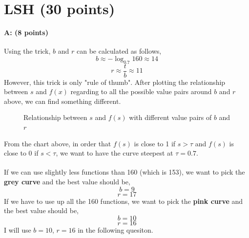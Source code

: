 \documentclass[11pt]{article}
\begin{document}
\section{LSH (30 points)}

\paragraph{A: (8 points)}
Using the trick, $b$ and $r$ can be calculated as follows,
$$b\approx-\log_{0.7}160\approx14$$
$$r\approx\frac{t}{b}\approx11$$
However, this trick is only "rule of thumb". After plotting the relationship between $s$ and $f(x)$ regarding to all the possible value pairs around $b$ and $r$ above, we can find something different.
\begin{figure}[H]
\caption{Relationship between $s$ and $f(s)$ with different value pairs of $b$ and $r$}
\label{fig:name}
\end{figure}
From the chart above, in order that $f(s)$ is close to 1 if $s>\tau$ and $f(s)$ is close to 0 if $s<\tau$, we want to have the curve steepest at $\tau=0.7$. \\\\
If we can use slightly less functions than 160 (which is 153), we want to pick the \textbf{grey curve} and the best value should be,
$$b=9$$
$$r=17$$
If we have to use up all the 160 functions, we want to pick the \textbf{pink curve} and the best value should be,
$$b=10$$
$$r=16$$
I will use $b=10$, $r=16$ in the following quesiton.
\end{document}
